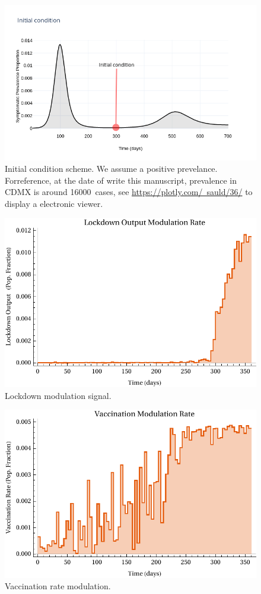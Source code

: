 \begin{figure}
    \centering
    \includegraphics[scale=0.5, keepaspectratio]{figs/InitialCondition}
    \caption[Initial condition]{
        Initial condition scheme. We assume a positive
        prevelance. Forreference, at the date of write this manuscript,
        prevalence in CDMX is
        around \SI{16000}{cases}, see
        \href{https://plotly.com/~sauld/36/}{https://plotly.com/~sauld/36/}
        to display a electronic viewer.}
        \label{fig:initialcondition}
\end{figure}

\begin{figure}[tbh]
    \centering
    \includegraphics[width=0.7\linewidth]{figs/lockdown_control_signal}
    \caption[Lockdown modulation signal.]{Lockdown modulation signal.}
    \label{fig:lockdowncontrolsignal}
\end{figure}

\begin{figure}
    \centering
    \includegraphics[width=0.7\linewidth]{figs/Vaccination_control_signal}
    \caption[Vaccination rate modulation.]{Vaccination rate modulation.}
    \label{fig:vaccinationcontrolsignal}
\end{figure}

